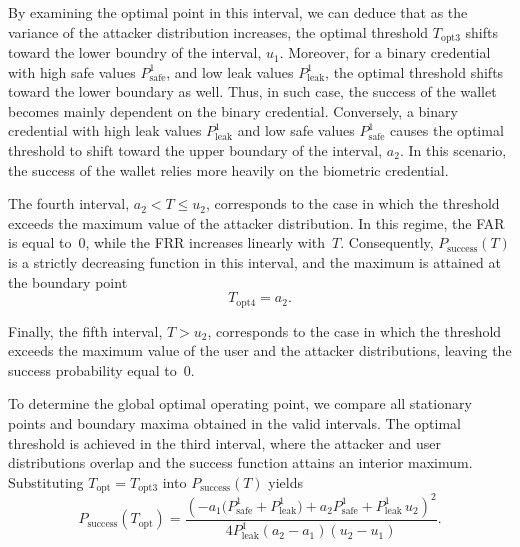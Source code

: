 \documentclass[sigconf]{acmart}
\theoremstyle{definition}
\begin{document}
By examining the optimal point in this interval, we can deduce that as the variance of the attacker distribution increases, the optimal threshold $T_{\text{opt3}}$ shifts toward the lower boundry of the interval, $u_1$. Moreover, for a binary credential with high safe values $P^{1}_{\text{safe}}$, and low leak values $P^{1}_{\text{leak}}$, the optimal threshold shifts toward the lower boundary as well. Thus, in such case, the success of the wallet becomes mainly dependent on the binary credential. Conversely, a binary credential with high leak values $P^{1}_{\text{leak}}$ and low safe values $P^{1}_{\text{safe}}$ causes the optimal threshold to shift toward the upper boundary of the interval, $a_2$. In this scenario, the success of the wallet relies more heavily on the biometric credential.

The fourth interval, $a_2 < T \le u_2$, corresponds to the case in which the threshold exceeds the maximum value of the attacker distribution. In this regime, the FAR is equal to~0, while the FRR increases linearly with~$T$. Consequently, $P_{\text{success}}(T)$ is a strictly decreasing function in this interval, and the maximum is attained at the boundary point
\[
T_{\text{opt4}} = a_2 .
\]

Finally, the fifth interval, $T > u_2$, corresponds to the case in which the threshold exceeds the maximum value of the user and the attacker distributions, leaving the success probability equal to~0.

To determine the global optimal operating point, we compare all stationary points and boundary maxima obtained in the valid intervals. The optimal threshold is achieved in the third interval, where the attacker and user distributions overlap and the success function attains an interior maximum. Substituting $T_{\text{opt}}=T_{\text{opt3}}$ into $P_{\text{success}}(T)$ yields
\[
P_{\text{success}}(T_{\text{opt}}) =
\frac{
\left(
- a_1 \big(P^{1}_{\text{safe}} + P^{1}_{\text{leak}}\big)
+ a_2 P^{1}_{\text{safe}}
+ P^{1}_{\text{leak}}\, u_2
\right)^2
}{
4 P^{1}_{\text{leak}} (a_2 - a_1)(u_2 - u_1)
}.
\]
\end{document}
